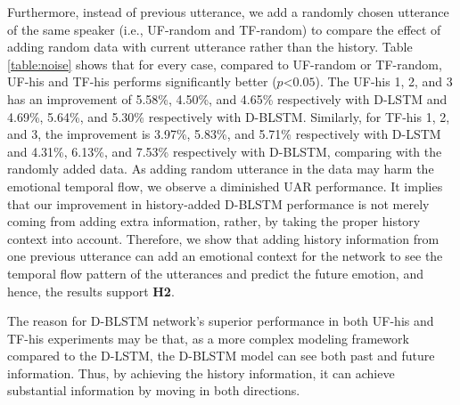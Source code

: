 Furthermore, instead of previous utterance, we add a randomly chosen utterance of the same speaker (i.e., UF-random and TF-random) to compare the effect of adding random data with current utterance rather than the history.  Table \ref{table:noise} shows that for every case, compared to UF-random or TF-random, UF-his and TF-his performs significantly better ($p$\textless$0.05$). The UF-his 1, 2, and 3 has an improvement of 5.58\%, 4.50\%, and 4.65\% respectively with D-LSTM and 4.69\%, 5.64\%, and 5.30\% respectively with D-BLSTM. Similarly, for TF-his 1, 2, and 3, the improvement is 3.97\%, 5.83\%, and 5.71\% respectively with D-LSTM and 4.31\%, 6.13\%, and 7.53\% respectively with D-BLSTM, comparing with the randomly added data.  As adding random utterance in the data may harm the emotional temporal flow, we observe a diminished UAR performance. It implies that our improvement in history-added D-BLSTM performance is not merely coming from adding extra information, rather, by taking the proper history context into account. Therefore, we show that adding history information from one previous utterance can add an emotional context for the network to see the temporal flow pattern of the utterances and predict the future emotion, and hence, the results support \textbf{H2}. 

The reason for D-BLSTM network's superior performance in both UF-his and TF-his experiments may be that, as a more complex modeling framework compared to the D-LSTM,  the D-BLSTM model can see both past and future information. Thus, by achieving the history information, it can achieve substantial information by moving in both directions. 

